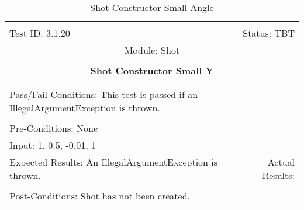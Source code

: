 \documentclass[titlepage]{article}
\begin{document}
\begin{center}%
\begin{table}
\begin{tabular}{|l r|}\hline&\\[-2mm]
	Test ID: 3.1.20	&Status: TBT\\[-3mm]
	\multicolumn{2}{|c|}{Module: Shot}\\&\\
	\multicolumn{2}{|c|}{\textbf{\large{Shot Constructor Small Y}}}\\&\\\hline&\\[-3mm]
	\multicolumn{2}{|p{\textwidth}|}{Pass/Fail Conditions: This test is passed if an IllegalArgumentException is thrown.}\\[1mm]\hline&\\[-3mm]
	\multicolumn{2}{|p{\textwidth}|}{Pre-Conditions: None}\\[4mm]
	\multicolumn{2}{|p{\textwidth}|}{Input: 1, 0.5, -0.01, 1}\\[2mm]\hline
	\multicolumn{1}{|p{0.49\textwidth}}{Expected Results: An IllegalArgumentException is thrown.}	&\multicolumn{1}{|p{0.45\textwidth}|}{Actual Results: }\\\hline&\\[-3mm]
	\multicolumn{2}{|p{\textwidth}|}{Post-Conditions: Shot has not been created.}\\\hline
\end{tabular}
\caption{Shot Constructor Small Angle}
\end{table}
\end{center}
\end{document}
